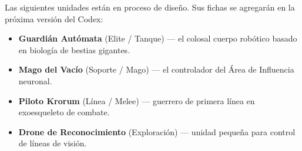 \vspace{1cm}
\begin{tcolorbox}[colback=GoldRule!10, colframe=GoldRule, title=\textbf{NOTA — UNIDADES PENDIENTES}]
\small Las siguientes unidades están en proceso de diseño. Sus fichas se agregarán en la próxima versión del Codex:
\begin{itemize}
    \item \textbf{Guardián Autómata} (Elite / Tanque) — el colosal cuerpo robótico basado en biología de bestias gigantes.
    \item \textbf{Mago del Vacío} (Soporte / Mago) — el controlador del Área de Influencia neuronal.
    \item \textbf{Piloto Krorum} (Línea / Melee) — guerrero de primera línea en exoesqueleto de combate.
    \item \textbf{Drone de Reconocimiento} (Exploración) — unidad pequeña para control de líneas de visión.
\end{itemize}
\end{tcolorbox}
